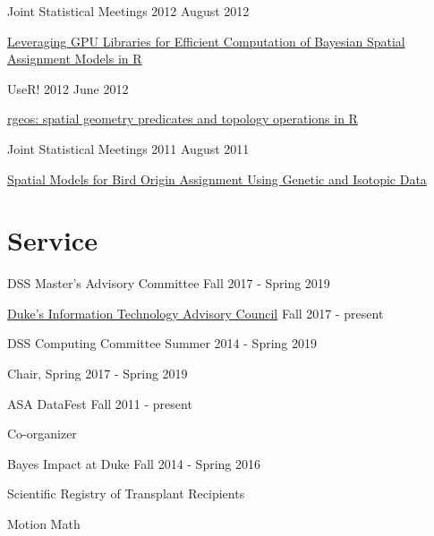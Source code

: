 \documentclass[margin,line]{res}
\begin{document}
\begin{resume}
Joint Statistical Meetings 2012 \hfill August 2012
\begin{list1}
\item[] \href{https://github.com/rundel/Presentations/tree/master/JSM%202012}{Leveraging GPU Libraries for Efficient Computation of Bayesian Spatial Assignment Models in R}
\end{list1}
\vspace{-3mm}

UseR! 2012 \hfill June 2012
\begin{list1}
\item[] \href{https://github.com/rundel/Presentations/tree/master/UseR2012}{rgeos: spatial geometry predicates and topology operations in R}
\end{list1}
\vspace{-3mm}

Joint Statistical Meetings 2011 \hfill August 2011
\begin{list1}
\item[] \href{https://github.com/rundel/Presentations/tree/master/JSM%202011}{Spatial Models for Bird Origin Assignment Using Genetic and Isotopic Data}
\end{list1}
\vspace{-3mm}

\vspace{4mm}

\section{\sc Service}

DSS Master's Advisory Committee \hfill Fall 2017 - Spring 2019

\href{http://services.duke.edu/itac/}{Duke's Information Technology Advisory Council} \hfill Fall 2017 - present

DSS Computing Committee \hfill Summer 2014 - Spring 2019
\begin{list1}
\item[] Chair, Spring 2017 - Spring 2019                 
\end{list1}

ASA DataFest \hfill Fall 2011 - present
\begin{list1}
\item[] Co-organizer
\end{list1}


Bayes Impact at Duke \hfill Fall 2014 - Spring 2016
\begin{list1}
\item[] Scientific Registry of Transplant Recipients
\item[] Motion Math
\end{list1}



\end{resume}
\end{document}

